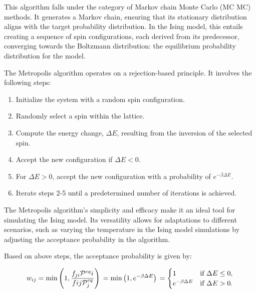 This algorithm falls under the category of Markov chain Monte Carlo (MC MC)
methods. It generates a Markov chain, ensuring that its stationary distribution
aligns with the target probability distribution. In the Ising model, this
entails creating a sequence of spin configurations, each derived from its
predecessor, converging towards the Boltzmann distribution: the equilibrium
probability distribution for the model.

The Metropolis algorithm operates on a rejection-based principle. It involves
the following steps:

\begin{enumerate}
\item Initialize the system with a random spin configuration.
\item Randomly select a spin within the lattice.
\item Compute the energy change, $\Delta E$, resulting from the inversion of the
selected spin.
\item Accept the new configuration if $\Delta E < 0$.
\item For $\Delta E > 0$, accept the new configuration with a probability of
$e^{-\beta \Delta E}$.
\item Iterate steps 2-5 until a predetermined number of iterations is achieved.
\end{enumerate}

The Metropolis algorithm's simplicity and efficacy make it an ideal tool for
simulating the Ising model. Its versatility allows for adaptations to different
scenarios, such as varying the temperature in the Ising model simulations by
adjusting the acceptance probability in the algorithm.

Based on above steps, the acceptance probability is given by:

\begin{equation}
    w_{ij} = \min \left( 1, \frac{f_{ji} \mathcal{P}^{eq}i}{f{ij} \mathcal{P}^{eq}_j} \right) \\
    = \min \left( 1, e^{-\beta \Delta E} \right) \\
    =
    \begin{cases}
        1 & \text{if } \Delta E \leq 0, \\
        e^{-\beta \Delta E} & \text{if } \Delta E > 0.
    \end{cases}
\end{equation}

